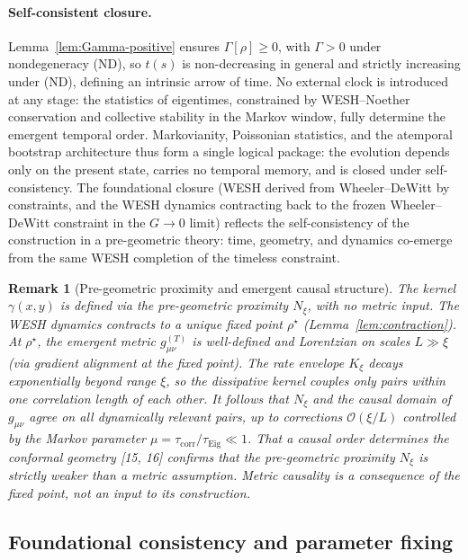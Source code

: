 \documentclass[12pt,a4paper]{article}
\newtheorem{remark}{Remark}[section]
\numberwithin{equation}{section}
\begin{document}
\paragraph{Self-consistent closure.}
Lemma~\ref{lem:Gamma-positive} ensures $\Gamma[\rho]\ge 0$, with $\Gamma>0$ under nondegeneracy (ND), so $t(s)$ is non-decreasing in general and strictly increasing under (ND), defining an intrinsic arrow of time. No external clock is introduced at any stage: the statistics of eigentimes, constrained by WESH--Noether conservation and collective stability in the Markov window, fully determine the emergent temporal order. Markovianity, Poissonian statistics, and the atemporal bootstrap architecture thus form a single logical package: the evolution depends only on the present state, carries no temporal memory, and is closed under self-consistency. The foundational closure (WESH derived from Wheeler--DeWitt by constraints,
and the WESH dynamics contracting back to the frozen Wheeler--DeWitt constraint
in the $G\!\to\!0$ limit) reflects the self-consistency of the construction
in a pre-geometric theory: time, geometry, and dynamics co-emerge from the same
WESH completion of the timeless constraint.

\begin{remark}[Pre-geometric proximity and emergent causal structure]
\label{rem:proximity-causality}
The kernel $\gamma(x,y)$ is defined via the pre-geometric proximity $N_\xi$, with no metric input. The WESH dynamics contracts to a unique fixed point $\rho^\star$ (Lemma~\ref{lem:contraction}). At $\rho^\star$, the emergent metric $g_{\mu\nu}^{(T)}$ is well-defined and Lorentzian on scales $L\gg\xi$ (via gradient alignment at the fixed point). The rate envelope $K_\xi$ decays exponentially beyond range $\xi$, so the dissipative kernel couples only pairs within one correlation length of each other. It follows that $N_\xi$ and the causal domain of $g_{\mu\nu}$ agree on all dynamically relevant pairs, up to corrections $\mathcal{O}(\xi/L)$ controlled by the Markov parameter $\mu = \tau_{\mathrm{corr}}/\tau_{\mathrm{Eig}}\ll 1$. That a causal order determines the conformal geometry [15, 16] confirms that the pre-geometric proximity $N_\xi$ is strictly weaker than a metric assumption. Metric causality is a consequence of the fixed point, not an input to its construction.
\end{remark}

\subsection{Foundational consistency and parameter fixing}
\end{document}
